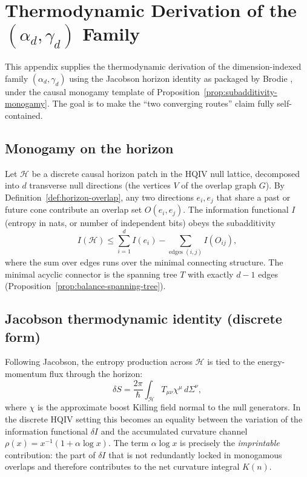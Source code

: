 \documentclass[11pt]{amsart}
\begin{document}
\appendix
\section[Thermodynamic derivation of the imprint family]{Thermodynamic Derivation of the \texorpdfstring{\((\alpha_d,\gamma_d)\)}{(alpha\_d, gamma\_d)} Family}
\label{sec:thermo-derivation}

This appendix supplies the thermodynamic derivation of the dimension-indexed family \((\alpha_d,\gamma_d)\) using the Jacobson horizon identity as packaged by Brodie \cite{brodie2026}, under the causal monogamy template of Proposition~\ref{prop:subadditivity-monogamy}. The goal is to make the ``two converging routes'' claim fully self-contained.

\subsection{Monogamy on the horizon}

Let \(\mathcal{H}\) be a discrete causal horizon patch in the HQIV null lattice, decomposed into \(d\) transverse null directions (the vertices \(V\) of the overlap graph \(G\)). By Definition~\ref{def:horizon-overlap}, any two directions \(e_i,e_j\) that share a past or future cone contribute an overlap set \(O(e_i,e_j)\). The information functional \(I\) (entropy in nats, or number of independent bits) obeys the subadditivity
\[
I(\mathcal{H})\le\sum_{i=1}^d I(e_i)-\sum_{\text{edges }(i,j)}I(O_{ij}),
\]
where the sum over edges runs over the minimal connecting structure. The minimal acyclic connector is the spanning tree \(T\) with exactly \(d-1\) edges (Proposition~\ref{prop:balance-spanning-tree}).

\subsection{Jacobson thermodynamic identity (discrete form)}

Following Jacobson, the entropy production across \(\mathcal{H}\) is tied to the energy-momentum flux through the horizon:
\[
\delta S=\frac{2\pi}{\hbar}\int_{\mathcal{H}}T_{\mu\nu}\chi^\mu\,d\Sigma^\nu,
\]
where \(\chi\) is the approximate boost Killing field normal to the null generators. In the discrete HQIV setting this becomes an equality between the variation of the information functional \(\delta I\) and the accumulated curvature channel \(\rho(x)=x^{-1}(1+\alpha\log x)\). The term \(\alpha\log x\) is precisely the \emph{imprintable} contribution: the part of \(\delta I\) that is not redundantly locked in monogamous overlaps and therefore contributes to the net curvature integral \(K(n)\).
\end{document}
